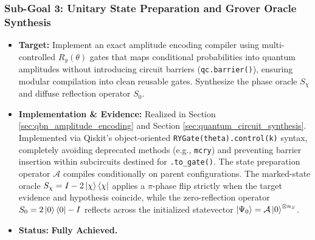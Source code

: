 \subsubsection{Sub-Goal 3: Unitary State Preparation and Grover Oracle Synthesis}
\begin{itemize}
    \item \textbf{Target:} Implement an exact amplitude encoding compiler using multi-controlled $R_y(\theta)$ gates that maps conditional probabilities into quantum amplitudes without introducing circuit barriers (\texttt{qc.barrier()}), ensuring modular compilation into clean reusable gates. Synthesize the phase oracle $S_\chi$ and diffuse reflection operator $S_0$.
    \item \textbf{Implementation \& Evidence:} Realized in Section \ref{sec:qbn_amplitude_encoding} and Section \ref{sec:quantum_circuit_synthesis}. Implemented via Qiskit's object-oriented \texttt{RYGate(theta).control(k)} syntax, completely avoiding deprecated methods (e.g., \texttt{mcry}) and preventing barrier insertion within subcircuits destined for \texttt{.to\_gate()}. The state preparation operator $\mathcal{A}$ compiles conditionally on parent configurations. The marked-state oracle $S_\chi = I - 2\left|\chi\right\rangle\left\langle\chi\right|$ applies a $\pi$-phase flip strictly when the target evidence and hypothesis coincide, while the zero-reflection operator $S_0 = 2\left|0\right\rangle\left\langle0\right| - I$ reflects across the initialized statevector $\left|\Psi_0\right\rangle = \mathcal{A}\left|0\right\rangle^{\otimes n_S}$.
    \item \textbf{Status:} \textbf{Fully Achieved.}
\end{itemize}

